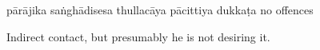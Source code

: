 \begin{exam}{\autoExamName}
\begin{problem*}
\begin{parts}
  \bigskip

  \begin{answers}{6}
    \bChoices
     pārājika\eAns
     saṅghādisesa\eAns
     thullacāya\eAns
     pācittiya\eAns
     dukkaṭa\eAns
     no offences\eAns
    \eChoices
  \end{answers}

  \begin{solution}
    Indirect contact, but presumably he is not desiring it.
  \end{solution}

  \end{parts}

\end{problem*}

\end{exam}
